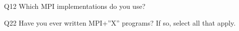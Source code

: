 \begin{description}%
\item{Q12} Which MPI implementations do you use?%
\item{Q22} Have you ever written MPI+”X” programs? If so, select all that apply.%
\end{description}%
